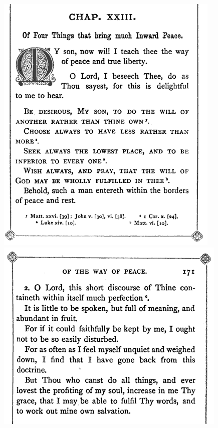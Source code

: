 \documentclass[11pt,a4paper]{scrartcl} %
\begin{document}
\begin{center}
\includegraphics[scale=0.7]{ss1}
\includegraphics[scale=0.7]{ss2}
\end{center}
\clearpage

\title{\textcolor{Maroon}{\rmfamily\normalfont{}}}
    \author{\textcolor{brown}{}}
    \date{} %
    
    \maketitle
    
\end{document}

